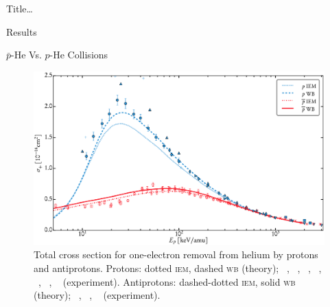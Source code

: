 \documentclass[letterpaper, 11 pt]{report}
\begin{document}
\begin{chapter}{ Title\dots \label{chap:p-he2p-he}}
\begin{section}{Results \label{sec:phe2p-res}}
\begin{subsection}{ \texorpdfstring{$\bar{p}$}{pbar}-He Vs. \texorpdfstring{$p$}{p}-He Collisions
                         \label{sec:pbarhe-res}}
         \begin{figure}[t]
            \centering
            \includegraphics[width = 0.95 \linewidth]{./images/pbarhe/pbarhe-+.eps}
            \caption[Total cross section for one-electron removal from helium by protons and
                     antiprotons.]
                    {Total cross section for one-electron removal from helium by protons and
                     antiprotons. Protons: dotted \textsc{iem}, dashed \textsc{wb} (theory);
                     {\color{blue}{$\blacktriangle$}}~\cite{DTR84}, {\color{blue}{$+$}}~\cite{Sol62},
                     {\color{blue}{$\bullet$}}~\cite{SG89}, {\color{blue}{$\blacklozenge$}}~\cite{SG85},
                     {\color{blue}{$\blacktriangleright$}}~\cite{PM70},
                     {\color{blue}{$\blacktriangledown$}}~\cite{Wex64},
                     {\color{blue}{$\blacksquare$}}~\cite{KAH84} (experiment).
                     Antiprotons: dashed-dotted \textsc{iem}, solid \textsc{wb} (theory);
                     {\color{red}{$\Box$}}~\cite{KKT08}, {\color{red}{$\circ$}}~\cite{HKM94},
                     {\color{red}{$\times$}}~\cite{AHK90} (experiment). \label{fig:he+}}
         \end{figure}


\end{subsection}
\end{section}
\end{chapter}
\end{document}
